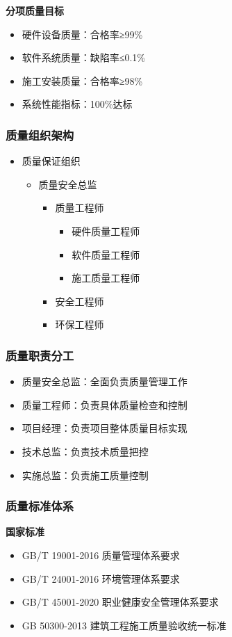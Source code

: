 \documentclass[UTF8,a4paper,zihao=-4]{ctexart}
\begin{document}
\textbf{分项质量目标}
\begin{itemize}
    \item 硬件设备质量：合格率≥99\%
    \item 软件系统质量：缺陷率≤0.1\%
    \item 施工安装质量：合格率≥98\%
    \item 系统性能指标：100\%达标
\end{itemize}

\subsubsection{质量组织架构}
\begin{itemize}
    \item 质量保证组织
    \begin{itemize}
        \item 质量安全总监
        \begin{itemize}
            \item 质量工程师
            \begin{itemize}
                \item 硬件质量工程师
                \item 软件质量工程师
                \item 施工质量工程师
            \end{itemize}
            \item 安全工程师
            \item 环保工程师
        \end{itemize}
    \end{itemize}
\end{itemize}

\subsubsection{质量职责分工}
\begin{itemize}
    \item 质量安全总监：全面负责质量管理工作
    \item 质量工程师：负责具体质量检查和控制
    \item 项目经理：负责项目整体质量目标实现
    \item 技术总监：负责技术质量把控
    \item 实施总监：负责施工质量控制
\end{itemize}

\subsubsection{质量标准体系}
\textbf{国家标准}
\begin{itemize}
    \item GB/T 19001-2016 质量管理体系要求
    \item GB/T 24001-2016 环境管理体系要求
    \item GB/T 45001-2020 职业健康安全管理体系要求
    \item GB 50300-2013 建筑工程施工质量验收统一标准
\end{itemize}
\end{document}
